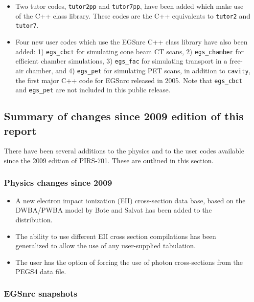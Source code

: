 \begin{itemize}

\item Two tutor codes, {\tt tutor2pp} and {\tt tutor7pp}, have been
added which make use of the C++ class library.  These codes are the
C++ equivalents to {\tt tutor2} and {\tt tutor7}.

\item Four new user codes which use the EGSnrc C++ class library have
also been added: 1) {\tt egs\_cbct} for simulating cone beam CT scans,
2) {\tt egs\_chamber} for efficient chamber simulations, 3) {\tt egs\_fac}
for simulating transport in a free-air chamber, and 4) {\tt egs\_pet} for
simulating PET scans, in addition to {\tt cavity}, the first major C++ code
for EGSnrc released in 2005. Note that {\tt egs\_cbct} and {\tt egs\_pet}
are not included in this public release.

\end{itemize}

\subsection{Summary of changes since 2009 edition of this report}

There have been several additions to the physics
and to the user codes available since the
2009 edition of PIRS-701.  These are outlined in this section.

\subsubsection{Physics changes since 2009}

\begin{itemize}

  \item A new electron impact ionization (EII) cross-section data base,
        based on the DWBA/PWBA model by Bote and Salvat has been added
        to the distribution.

  \item The ability to use different EII cross section compilations
        has been generalized to allow the use of any user-supplied
        tabulation.

  \item The user has the option of forcing the use of photon
        cross-sections from the PEGS4 data file.

\end{itemize}

\subsubsection{ EGSnrc snapshots }

